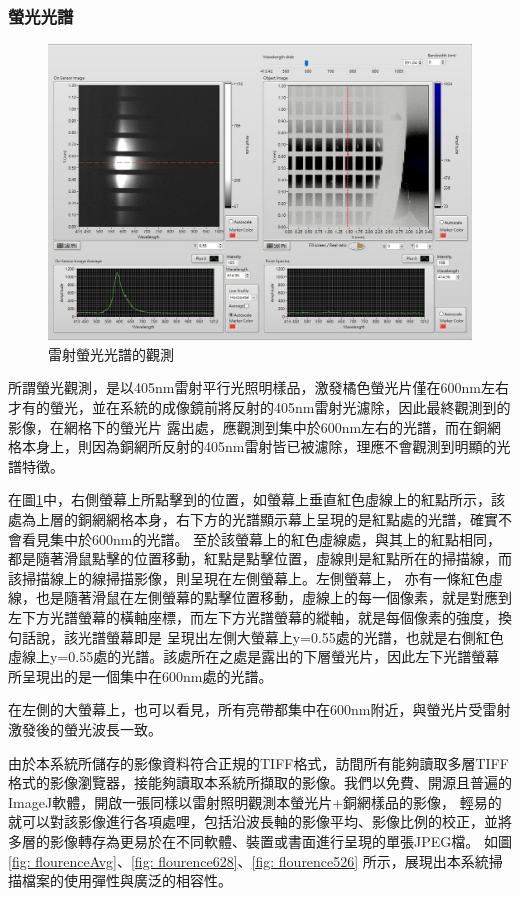 \documentclass[12pt]{article}
\begin{document}
\subsubsection{螢光光譜}
\begin{figure}
    \centering
    \includegraphics[width = 0.9\linewidth]{flourence.jpeg}
    \caption{雷射螢光光譜的觀測}
    \label{fig: flourence}
\end{figure}
所謂螢光觀測，是以405nm雷射平行光照明樣品，激發橘色螢光片僅在600nm左右才有的螢光，並在系統的成像鏡前將反射的405nm雷射光濾除，因此最終觀測到的影像，在網格下的螢光片
露出處，應觀測到集中於600nm左右的光譜，而在銅網格本身上，則因為銅網所反射的405nm雷射皆已被濾除，理應不會觀測到明顯的光譜特徵。

在圖\ref{fig: flourence}中，右側螢幕上所點擊到的位置，如螢幕上垂直紅色虛線上的紅點所示，該處為上層的銅網網格本身，右下方的光譜顯示幕上呈現的是紅點處的光譜，確實不會看見集中於600nm的光譜。
至於該螢幕上的紅色虛線處，與其上的紅點相同，都是隨著滑鼠點擊的位置移動，紅點是點擊位置，虛線則是紅點所在的掃描線，而該掃描線上的線掃描影像，則呈現在左側螢幕上。左側螢幕上，
亦有一條紅色虛線，也是隨著滑鼠在左側螢幕的點擊位置移動，虛線上的每一個像素，就是對應到左下方光譜螢幕的橫軸座標，而左下方光譜螢幕的縱軸，就是每個像素的強度，換句話說，該光譜螢幕即是
呈現出左側大螢幕上y=0.55處的光譜，也就是右側紅色虛線上y=0.55處的光譜。該處所在之處是露出的下層螢光片，因此左下光譜螢幕所呈現出的是一個集中在600nm處的光譜。

在左側的大螢幕上，也可以看見，所有亮帶都集中在600nm附近，與螢光片受雷射激發後的螢光波長一致。

由於本系統所儲存的影像資料符合正規的TIFF格式，訪間所有能夠讀取多層TIFF格式的影像瀏覽器，接能夠讀取本系統所擷取的影像。我們以免費、開源且普遍的ImageJ軟體，開啟一張同樣以雷射照明觀測本螢光片+銅網樣品的影像，
輕易的就可以對該影像進行各項處哩，包括沿波長軸的影像平均、影像比例的校正，並將多層的影像轉存為更易於在不同軟體、裝置或書面進行呈現的單張JPEG檔。
如圖\ref{fig: flourenceAvg}、\ref{fig: flourence628}、\ref{fig: flourence526}
所示，展現出本系統掃描檔案的使用彈性與廣泛的相容性。
\end{document}
